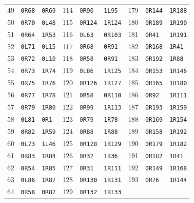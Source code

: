 {\begin{longtable}{@{}rll@{\hspace{1.8em}}rll@{\hspace{1.8em}}rll@{}}
49 & \texttt{0R68} & \texttt{0R69} & 114 & \texttt{0R90} & \texttt{1L95} & 179 & \texttt{0R144} & \texttt{1R188}\\
50 & \texttt{0R70} & \texttt{0L48} & 115 & \texttt{0R124} & \texttt{1R124} & 180 & \texttt{0R189} & \texttt{1R190}\\
51 & \texttt{0R64} & \texttt{1R53} & 116 & \texttt{0L63} & \texttt{0R103} & 181 & \texttt{0R41} & \texttt{1R191}\\
52 & \texttt{0L71} & \texttt{0L15} & 117 & \texttt{0R68} & \texttt{0R91} & 182 & \texttt{0R168} & \texttt{1R41}\\
53 & \texttt{0R72} & \texttt{0L10} & 118 & \texttt{0R58} & \texttt{0R91} & 183 & \texttt{0R192} & \texttt{1R88}\\
54 & \texttt{0R73} & \texttt{1R74} & 119 & \texttt{0L86} & \texttt{1R125} & 184 & \texttt{0R153} & \texttt{1R146}\\
55 & \texttt{0R75} & \texttt{1R76} & 120 & \texttt{0R126} & \texttt{1R127} & 185 & \texttt{0R165} & \texttt{1R180}\\
56 & \texttt{0R77} & \texttt{1R78} & 121 & \texttt{0R58} & \texttt{0R110} & 186 & \texttt{0R92} & \texttt{1R111}\\
57 & \texttt{0R79} & \texttt{1R80} & 122 & \texttt{0R99} & \texttt{1R113} & 187 & \texttt{0R193} & \texttt{1R159}\\
58 & \texttt{0L81} & \texttt{0R1} & 123 & \texttt{0R79} & \texttt{1R78} & 188 & \texttt{0R169} & \texttt{1R154}\\
59 & \texttt{0R82} & \texttt{1R59} & 124 & \texttt{0R88} & \texttt{1R88} & 189 & \texttt{0R158} & \texttt{1R192}\\
60 & \texttt{0L73} & \texttt{1L46} & 125 & \texttt{0R128} & \texttt{1R129} & 190 & \texttt{0R179} & \texttt{1R182}\\
61 & \texttt{0R83} & \texttt{1R84} & 126 & \texttt{0R32} & \texttt{1R36} & 191 & \texttt{0R182} & \texttt{1R41}\\
62 & \texttt{0R54} & \texttt{1R85} & 127 & \texttt{0R31} & \texttt{1R111} & 192 & \texttt{0R149} & \texttt{1R168}\\
63 & \texttt{0L86} & \texttt{1R87} & 128 & \texttt{0R130} & \texttt{1R131} & 193 & \texttt{0R76} & \texttt{1R144}\\
64 & \texttt{0R58} & \texttt{0R82} & 129 & \texttt{0R132} & \texttt{1R133} &  &  & \\
\bottomrule\end{longtable}}
